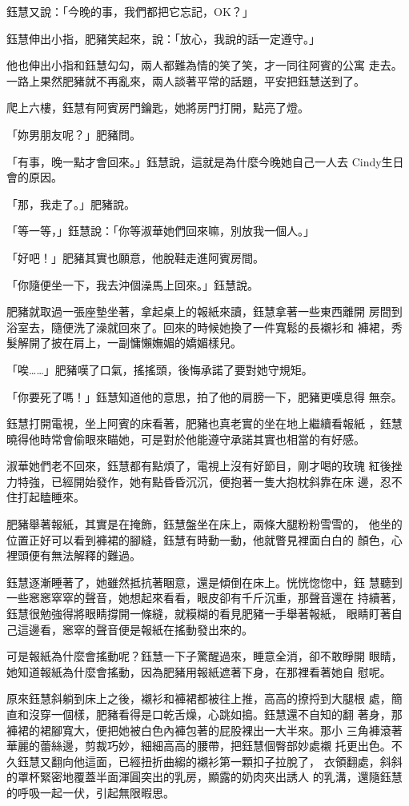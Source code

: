 鈺慧又說：「今晚的事，我們都把它忘記，OK？」

鈺慧伸出小指，肥豬笑起來，說：「放心，我說的話一定遵守。」

他也伸出小指和鈺慧勾勾，兩人都難為情的笑了笑，才一同往阿賓的公寓
走去。一路上果然肥豬就不再亂來，兩人談著平常的話題，平安把鈺慧送到了。

爬上六樓，鈺慧有阿賓房門鑰匙，她將房門打開，點亮了燈。

「妳男朋友呢？」肥豬問。

「有事，晚一點才會回來。」鈺慧說，這就是為什麼今晚她自己一人去
Cindy生日會的原因。

「那，我走了。」肥豬說。

「等一等，」鈺慧說：「你等淑華她們回來嘛，別放我一個人。」

「好吧！」肥豬其實也願意，他脫鞋走進阿賓房間。

「你隨便坐一下，我去沖個澡馬上回來。」鈺慧說。

肥豬就取過一張座墊坐著，拿起桌上的報紙來讀，鈺慧拿著一些東西離開
房間到浴室去，隨便洗了澡就回來了。回來的時候她換了一件寬鬆的長襯衫和
褲裙，秀髮解開了披在肩上，一副慵懶嫵媚的嬌媚樣兒。

「唉……」肥豬嘆了口氣，搖搖頭，後悔承諾了要對她守規矩。

「你要死了嗎！」鈺慧知道他的意思，拍了他的肩膀一下，肥豬更嘆息得
無奈。

鈺慧打開電視，坐上阿賓的床看著，肥豬也真老實的坐在地上繼續看報紙
，鈺慧曉得他時常會偷眼來瞄她，可是對於他能遵守承諾其實也相當的有好感。

淑華她們老不回來，鈺慧都有點煩了，電視上沒有好節目，剛才喝的玫瑰
紅後挫力特強，已經開始發作，她有點昏昏沉沉，便抱著一隻大抱枕斜靠在床
邊，忍不住打起瞌睡來。

肥豬舉著報紙，其實是在掩飾，鈺慧盤坐在床上，兩條大腿粉粉雪雪的，
他坐的位置正好可以看到褲裙的腳縫，鈺慧有時動一動，他就瞥見裡面白白的
顏色，心裡頭便有無法解釋的難過。

鈺慧逐漸睡著了，她雖然抵抗著睏意，還是傾倒在床上。恍恍惚惚中，鈺
慧聽到一些窸窸窣窣的聲音，她想起來看看，眼皮卻有千斤沉重，那聲音還在
持續著，鈺慧很勉強得將眼睛撐開一條縫，就糢糊的看見肥豬一手舉著報紙，
眼睛盯著自己這邊看，窸窣的聲音便是報紙在搖動發出來的。

可是報紙為什麼會搖動呢？鈺慧一下子驚醒過來，睡意全消，卻不敢睜開
眼睛，她知道報紙為什麼會搖動，因為肥豬用報紙遮著下身，在那裡看著她自
慰呢。

原來鈺慧斜躺到床上之後，襯衫和褲裙都被往上推，高高的撩捋到大腿根
處，簡直和沒穿一個樣，肥豬看得是口乾舌燥，心跳如搗。鈺慧還不自知的翻
著身，那褲裙的裙腳寬大，便把她被白色內褲包著的屁股裸出一大半來。那小
三角褲滾著華麗的蕾絲邊，剪裁巧妙，細細高高的腰帶，把鈺慧個臀部妙處襯
托更出色。不久鈺慧又翻向他這面，已經扭折曲縐的襯衫第一顆扣子拉脫了，
衣領翻處，斜斜的罩杯緊密地覆蓋半面渾圓突出的乳房，顯露的奶肉夾出誘人
的乳溝，還隨鈺慧的呼吸一起一伏，引起無限暇思。

